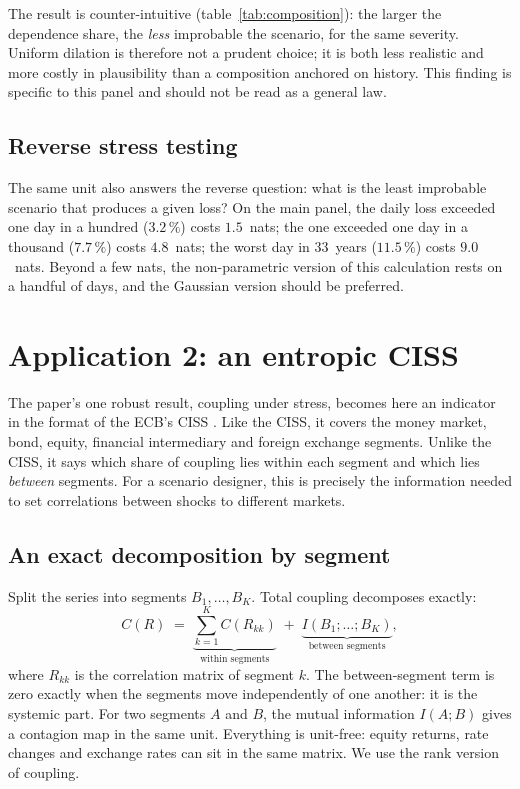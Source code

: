 \documentclass[11pt]{article}
\theoremstyle{definition}
\begin{document}
The result is counter-intuitive (table~\ref{tab:composition}): the larger the
dependence share, the \emph{less} improbable the scenario, for the same
severity. Uniform dilation is therefore not a prudent choice; it is both less
realistic and more costly in plausibility than a composition anchored on
history. This finding is specific to this panel and should not be read as a
general law.

\subsection{Reverse stress testing}

The same unit also answers the reverse question: what is the least improbable
scenario that produces a given loss? On the main panel, the daily loss
exceeded one day in a hundred ($3.2\,\%$) costs $1.5$~nats; the one exceeded
one day in a thousand ($7.7\,\%$) costs $4.8$~nats; the worst day in 33~years
($11.5\,\%$) costs $9.0$~nats. Beyond a few nats, the non-parametric version
of this calculation rests on a handful of days, and the Gaussian version
should be preferred.

\section{Application 2: an entropic CISS}
\label{sec:cb}

The paper's one robust result, coupling under stress, becomes here an
indicator in the format of the ECB's CISS \citep{hollo2012}. Like the CISS, it
covers the money market, bond, equity, financial intermediary and foreign
exchange segments. Unlike the CISS, it says which share of coupling lies
within each segment and which lies \emph{between} segments. For a scenario
designer, this is precisely the information needed to set correlations
between shocks to different markets.

\subsection{An exact decomposition by segment}

Split the series into segments $B_1,\dots,B_K$. Total coupling decomposes
exactly:
\begin{equation}
\label{eq:blocks}
C(R) \;=\; \underbrace{\sum_{k=1}^{K} C(R_{kk})}_{\text{within segments}}
\;+\; \underbrace{I(B_1;\dots;B_K)}_{\text{between segments}},
\end{equation}
where $R_{kk}$ is the correlation matrix of segment $k$. The between-segment
term is zero exactly when the segments move independently of one another: it
is the systemic part. For two segments $A$ and $B$, the mutual information
$I(A;B)$ gives a contagion map in the same unit. Everything is unit-free:
equity returns, rate changes and exchange rates can sit in the same matrix. We
use the rank version of coupling.
\end{document}
